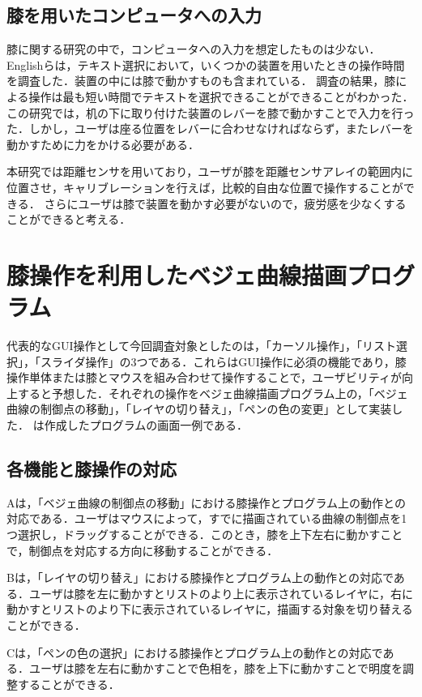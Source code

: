\documentclass[submit, techrep]{ipsj}
\begin{document}
\subsection{膝を用いたコンピュータへの入力}
膝に関する研究の中で，コンピュータへの入力を想定したものは少ない．
Englishら\cite{1698228}は，テキスト選択において，いくつかの装置を用いたときの操作時間を調査した．装置の中には膝で動かすものも含まれている．
調査の結果，膝による操作は最も短い時間でテキストを選択できることができることがわかった．
この研究では，机の下に取り付けた装置のレバーを膝で動かすことで入力を行った．しかし，ユーザは座る位置をレバーに合わせなければならず，またレバーを動かすために力をかける必要がある．\par
本研究では距離センサを用いており，ユーザが膝を距離センサアレイの範囲内に位置させ，キャリブレーションを行えば，比較的自由な位置で操作することができる．
さらにユーザは膝で装置を動かす必要がないので，疲労感を少なくすることができると考える．

\section{膝操作を利用したベジェ曲線描画プログラム}
代表的なGUI操作として今回調査対象としたのは，「カーソル操作」，「リスト選択」，「スライダ操作」の3つである．これらはGUI操作に必須の機能であり，膝操作単体または膝とマウスを組み合わせて操作することで，ユーザビリティが向上すると予想した．それぞれの操作をベジェ曲線描画プログラム上の，「ベジェ曲線の制御点の移動」，「レイヤの切り替え」，「ペンの色の変更」として実装した．
は作成したプログラムの画面一例である．
\subsection{各機能と膝操作の対応}
Aは，「ベジェ曲線の制御点の移動」における膝操作とプログラム上の動作との対応である．ユーザはマウスによって，すでに描画されている曲線の制御点を1つ選択し，ドラッグすることができる．このとき，膝を上下左右に動かすことで，制御点を対応する方向に移動することができる．\par
{}Bは，「レイヤの切り替え」における膝操作とプログラム上の動作との対応である．ユーザは膝を左に動かすとリストのより上に表示されているレイヤに，右に動かすとリストのより下に表示されているレイヤに，描画する対象を切り替えることができる．\par
{}Cは，「ペンの色の選択」における膝操作とプログラム上の動作との対応である．ユーザは膝を左右に動かすことで色相を，膝を上下に動かすことで明度を調整することができる．
\end{document}
